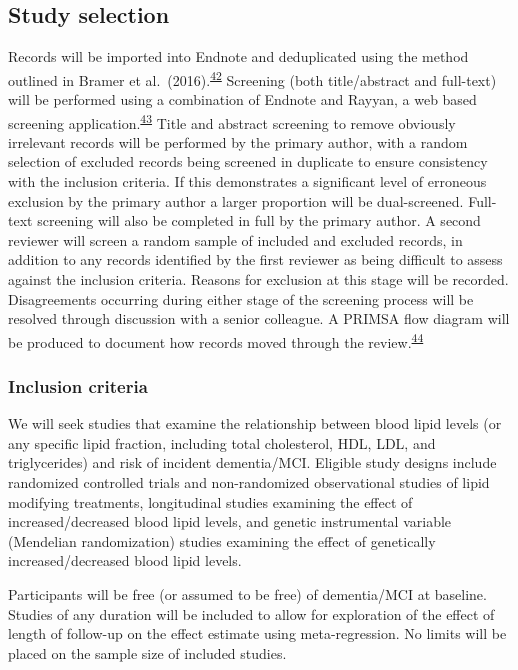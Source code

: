 \documentclass[a4paper, twoside]{templates/ociamthesis}
\begin{document}
\hypertarget{study-selection}{%
\subsection{Study selection}\label{study-selection}}

Records will be imported into Endnote and deduplicated using the method outlined in Bramer et al.~(2016).\textsuperscript{\protect\hyperlink{ref-bramer2016}{42}} Screening (both title/abstract and full-text) will be performed using a combination of Endnote and Rayyan, a web based screening application.\textsuperscript{\protect\hyperlink{ref-ouzzani2016}{43}} Title and abstract screening to remove obviously irrelevant records will be performed by the primary author, with a random selection of excluded records being screened in duplicate to ensure consistency with the inclusion criteria. If this demonstrates a significant level of erroneous exclusion by the primary author a larger proportion will be dual-screened. Full-text screening will also be completed in full by the primary author. A second reviewer will screen a random sample of included and excluded records, in addition to any records identified by the first reviewer as being difficult to assess against the inclusion criteria. Reasons for exclusion at this stage will be recorded. Disagreements occurring during either stage of the screening process will be resolved through discussion with a senior colleague. A PRIMSA flow diagram will be produced to document how records moved through the review.\textsuperscript{\protect\hyperlink{ref-zotero-766}{44}}

\hypertarget{inclusion-criteria}{%
\subsubsection{Inclusion criteria}\label{inclusion-criteria}}

We will seek studies that examine the relationship between blood lipid levels (or any specific lipid fraction, including total cholesterol, HDL, LDL, and triglycerides) and risk of incident dementia/MCI. Eligible study designs include randomized controlled trials and non-randomized observational studies of lipid modifying treatments, longitudinal studies examining the effect of increased/decreased blood lipid levels, and genetic instrumental variable (Mendelian randomization) studies examining the effect of genetically increased/decreased blood lipid levels.

Participants will be free (or assumed to be free) of dementia/MCI at baseline. Studies of any duration will be included to allow for exploration of the effect of length of follow-up on the effect estimate using meta-regression. No limits will be placed on the sample size of included studies.
\end{document}
